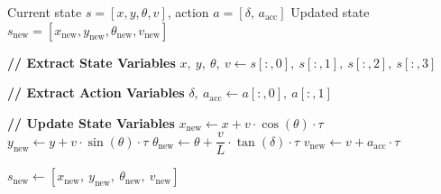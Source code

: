 \documentclass[nonacm,sigconf]{acmart}
\begin{document}
\begin{algorithm}[h]
\caption{Dynamics of Bicycle Model}
\label{alg:bicycle_dynamics}
\begin{algorithmic}[1]
\Require Current state $s = [x, y, \theta, v]$,
         action $a = [\delta,\, a_{\text{acc}}]$
\Ensure  Updated state
         $s_{\text{new}} =
         [x_{\text{new}}, y_{\text{new}}, \theta_{\text{new}}, v_{\text{new}}]$

\State \textbf{// Extract State Variables}
\State $x,\ y,\ \theta,\ v
       \gets s[:,0],\ s[:,1],\ s[:,2],\ s[:,3]$

\State \textbf{// Extract Action Variables}
\State $\delta,\ a_{\text{acc}} \gets a[:,0],\ a[:,1]$

\State \textbf{// Update State Variables}
\State $x_{\text{new}}      \gets x      + v \cdot \cos(\theta) \cdot \tau$
\State $y_{\text{new}}      \gets y      + v \cdot \sin(\theta) \cdot \tau$
\State $\theta_{\text{new}} \gets \theta + \dfrac{v}{L} \cdot \tan(\delta) \cdot \tau$
\State $v_{\text{new}}      \gets v      + a_{\text{acc}} \cdot \tau$

\State \Return
       $s_{\text{new}} \gets
       [x_{\text{new}},\ y_{\text{new}},\
        \theta_{\text{new}},\ v_{\text{new}}]$
\end{algorithmic}
\end{algorithm}
\end{document}
